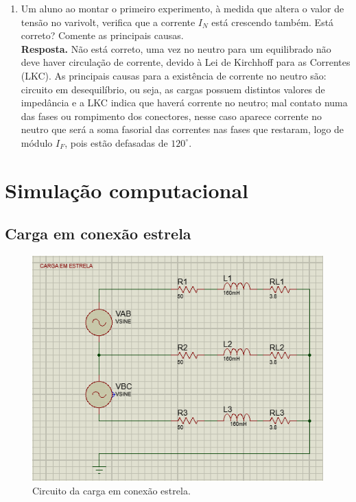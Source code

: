 \documentclass[a4paper,12pt,oneside,openany,table,xcdraw]{article}
\begin{document}
\begin{enumerate}[1)]
 \item Um aluno ao montar o primeiro experimento, à medida que altera o valor de
tensão no varivolt, verifica que a corrente $I_N$ está crescendo também. Está correto?
Comente as principais causas.\\
\textbf{Resposta.} Não está correto, uma vez no neutro para um equilibrado não deve haver circulação de corrente, devido à Lei de Kirchhoff para as Correntes (LKC). As principais causas para a existência de corrente no neutro são: circuito em desequilíbrio, ou seja, as cargas possuem distintos valores de impedância e a LKC indica que haverá corrente no neutro; mal contato numa das fases ou rompimento dos conectores, nesse caso aparece corrente no neutro que será a soma fasorial das correntes nas fases que restaram, logo de módulo $I_F$, pois estão defasadas de $120^\circ$.  

\end{enumerate}

\newpage
\section{Simulação computacional} %
\subsection{Carga em conexão estrela}
\begin{figure}[H]
\centering
\captionsetup{font=scriptsize}
\includegraphics[width=14cm]{sim1}
\caption{Circuito da carga em conexão estrela.}
\label{sim1}
\end{figure}
\end{document}
